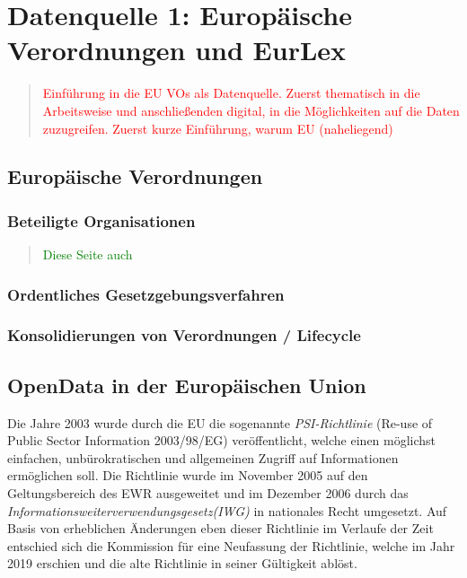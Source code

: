 \chapter{Datenquelle 1: Europäische Verordnungen und EurLex}

\begin{quote}
\textcolor{red}{Einführung in die EU VOs als Datenquelle. Zuerst thematisch in die Arbeitsweise und anschließenden digital, in die Möglichkeiten auf die Daten zuzugreifen.
Zuerst kurze Einführung, warum EU (naheliegend)}
\end{quote}

    \section{Europäische Verordnungen}
        \subsection{Beteiligte Organisationen}
    
            \pagebreak    
        
            
\begin{quote}
\textcolor{green}{Diese Seite auch}
\end{quote}
            \pagebreak    
        \subsection{Ordentliches Gesetzgebungsverfahren}
            \pagebreak    
        
        \subsection{Konsolidierungen von Verordnungen / Lifecycle}
            \pagebreak    
        

    \section{OpenData in der Europäischen Union}

Die Jahre 2003 wurde durch die EU die sogenannte \textit{PSI-Richtlinie} (Re-use of Public Sector Information 2003/98/EG) veröffentlicht, welche einen möglichst einfachen, unbürokratischen und allgemeinen Zugriff auf Informationen ermöglichen soll.
Die Richtlinie wurde im November 2005 auf den Geltungsbereich des EWR ausgeweitet\cite{2005D0105} und im Dezember 2006 durch das \textit{Informationsweiterverwendungsgesetz(IWG)} in nationales Recht umgesetzt.
Auf Basis von erheblichen Änderungen eben dieser Richtlinie im Verlaufe der Zeit entschied sich die Kommission für eine Neufassung der Richtlinie, welche im Jahr 2019 erschien und die alte Richtlinie in seiner Gültigkeit ablöst. \cite[Prä. Abs. 1ff.]{2003L0098}



